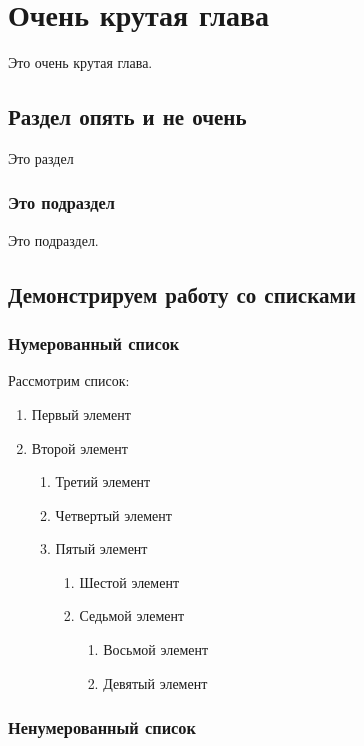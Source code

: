\documentclass[12pt]{extarticle}
\begin{document}
\section{Очень крутая глава}
\label{sec:orgc4542bd}
Это очень крутая глава.
\subsection{Раздел опять и не очень}
\label{sec:org973cb1f}

Это раздел
\subsubsection{Это подраздел}
\label{sec:org0d75f1d}

Это подраздел.
\subsection{Демонстрируем работу со списками}
\label{sec:orge4d7a51}

\subsubsection{Нумерованный список}
\label{sec:orgd20324f}

Рассмотрим список:
\begin{enumerate}
\item Первый элемент
\item Второй элемент
\begin{enumerate}
\item Третий элемент
\item Четвертый элемент
\item Пятый элемент
\begin{enumerate}
\item Шестой элемент
\item Седьмой элемент
\begin{enumerate}
\item Восьмой элемент
\item Девятый элемент
\end{enumerate}
\end{enumerate}
\end{enumerate}
\end{enumerate}
\subsubsection{Ненумерованный список}
\label{sec:org86558a8}
\end{document}
